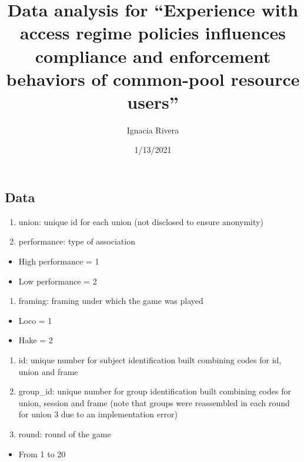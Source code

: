 \documentclass[
]{article}
\title{Data analysis for ``Experience with access regime policies influences
compliance and enforcement behaviors of common-pool resource users''}
\author{Ignacia Rivera}
\date{1/13/2021}
\providecommand{\tightlist}{%
  \setlength{\itemsep}{0pt}\setlength{\parskip}{0pt}}
\begin{document}
\maketitle

\hypertarget{data}{%
\subsection{Data}\label{data}}

\begin{enumerate}
\def\labelenumi{\arabic{enumi})}
\item
  union: unique id for each union (not disclosed to ensure anonymity)
\item
  performance: type of association
\end{enumerate}

\begin{itemize}
\tightlist
\item
  High performance = 1
\item
  Low performance = 2
\end{itemize}

\begin{enumerate}
\def\labelenumi{\arabic{enumi})}
\setcounter{enumi}{2}
\tightlist
\item
  framing: framing under which the game was played
\end{enumerate}

\begin{itemize}
\tightlist
\item
  Loco = 1
\item
  Hake = 2
\end{itemize}

\begin{enumerate}
\def\labelenumi{\arabic{enumi})}
\setcounter{enumi}{3}
\item
  id: unique number for subject identification built combining codes for
  id, union and frame
\item
  group\_id: unique number for group identification built combining
  codes for union, session and frame (note that groups were reassembled
  in each round for union 3 due to an implementation error)
\item
  round: round of the game
\end{enumerate}

\begin{itemize}
\tightlist
\item
  From 1 to 20
\end{itemize}
\end{document}
